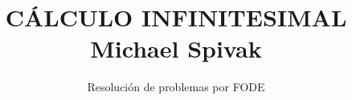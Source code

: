 \normalfont

\author{\Large Resolución de problemas por FODE}
\title{CÁLCULO INFINITESIMAL \\ \small Michael Spivak}
\date{}
\pagestyle{empty}
\maketitle
\thispagestyle{empty}
\let\cleardoublepage\clearpage
\tableofcontents 								%


 
\let\cleardoublepage\clearpage